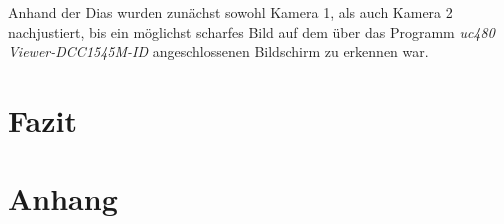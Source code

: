 \documentclass[12pt,a4paper]{article}
\begin{document}
	Anhand der Dias wurden zunächst sowohl Kamera 1, als auch Kamera 2 nachjustiert, bis ein möglichst scharfes Bild auf dem über das Programm \textit{uc480 Viewer-DCC1545M-ID} angeschlossenen Bildschirm zu erkennen war. %
		
	
	
	\clearpage
	\newpage
	
	\section{Fazit} %
	
	
	\newpage
	\clearpage
	
	
	
	\newpage
	\clearpage
	
	
	
	
	
	
	\newpage
	
	\listoffigures %
	
	\newpage
	\clearpage
	
	\section{Anhang}
	
	
\end{document}
